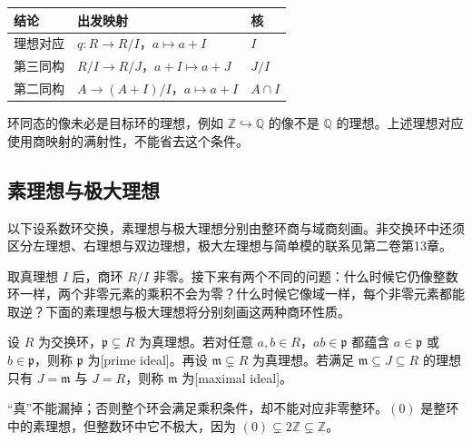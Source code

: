 \begin{center}
	\begin{tabularx}{\linewidth}{@{}l>{\raggedright\arraybackslash}Xl@{}}
		\toprule
		结论 & 出发映射 & 核 \\
		\midrule
		理想对应 & \(q:R\to R/I\)，\(a\mapsto a+I\) & \(I\) \\
		第三同构 & \(R/I\to R/J\)，\(a+I\mapsto a+J\) & \(J/I\) \\
		第二同构 & \(A\to(A+I)/I\)，\(a\mapsto a+I\) & \(A\cap I\) \\
		\bottomrule
	\end{tabularx}
\end{center}

环同态的像未必是目标环的理想，例如 \(\mathbb Z\hookrightarrow\mathbb Q\) 的像不是 \(\mathbb Q\) 的理想。上述理想对应使用商映射的满射性，不能省去这个条件。

\subsection{素理想与极大理想}
\label{b1:subsec:1002:03}
以下设系数环交换，素理想与极大理想分别由整环商与域商刻画。非交换环中还须区分左理想、右理想与双边理想，极大左理想与简单模的联系见第二卷第13章。

\ProseParagraphBreak
取真理想 \(I\) 后，商环 \(R/I\) 非零。接下来有两个不同的问题：什么时候它仍像整数环一样，两个非零元素的乘积不会为零？什么时候它像域一样，每个非零元素都能取逆？下面的素理想与极大理想将分别刻画这两种商环性质。

\begin{definition}\label{b1:def:prime-maximal-ideal}
	设 \(R\) 为交换环，\(\mathfrak p\subsetneq R\) 为真理想。若对任意 \(a,b\in R\)，\(ab\in\mathfrak p\) 都蕴含 \(a\in\mathfrak p\) 或 \(b\in\mathfrak p\)，则称 \(\mathfrak p\) 为[prime ideal]。再设 \(\mathfrak m\subsetneq R\) 为真理想。若满足 \(\mathfrak m\subseteq J\subseteq R\) 的理想只有 \(J=\mathfrak m\) 与 \(J=R\)，则称 \(\mathfrak m\) 为[maximal ideal]。
\end{definition}
“真”不能漏掉；否则整个环会满足乘积条件，却不能对应非零整环。\((0)\) 是整环中的素理想，但整数环中它不极大，因为 \((0)\subsetneq2\mathbb Z\subsetneq\mathbb Z\)。

